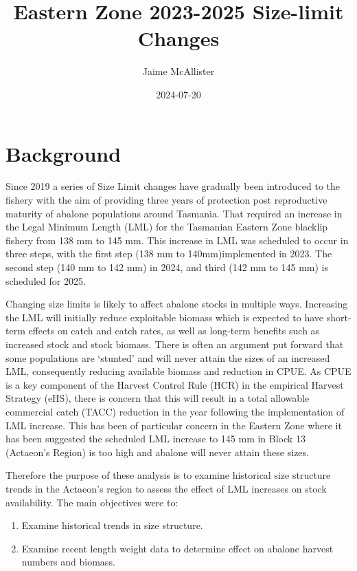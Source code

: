 \documentclass[
]{article}
\title{Eastern Zone 2023-2025 Size-limit Changes}
\author{Jaime McAllister}
\date{2024-07-20}
\providecommand{\tightlist}{%
  \setlength{\itemsep}{0pt}\setlength{\parskip}{0pt}}
\begin{document}
\maketitle

{
\setcounter{tocdepth}{2}
\tableofcontents
}
\section{Background}\label{background}

Since 2019 a series of Size Limit changes have gradually been introduced to the fishery with the aim of providing three years of protection post reproductive maturity of abalone populations around Tasmania. That required an increase in the Legal Minimum Length (LML) for the Tasmanian Eastern Zone blacklip fishery from 138 mm to 145 mm. This increase in LML was scheduled to occur in three steps, with the first step (138 mm to 140mm)implemented in 2023. The second step (140 mm to 142 mm) in 2024, and third (142 mm to 145 mm) is scheduled for 2025.

Changing size limits is likely to affect abalone stocks in multiple ways. Increasing the LML will initially reduce exploitable biomass which is expected to have short-term effects on catch and catch rates, as well as long-term benefits such as increased stock and stock biomass. There is often an argument put forward that some populations are `stunted' and will never attain the sizes of an increased LML, consequently reducing available biomass and reduction in CPUE. As CPUE is a key component of the Harvest Control Rule (HCR) in the empirical Harvest Strategy (eHS), there is concern that this will result in a total allowable commercial catch (TACC) reduction in the year following the implementation of LML increase. This has been of particular concern in the Eastern Zone where it has been suggested the scheduled LML increase to 145 mm in Block 13 (Actaeon's Region) is too high and abalone will never attain these sizes.

Therefore the purpose of these analysis is to examine historical size structure trends in the Actaeon's region to assess the effect of LML increases on stock availability. The main objectives were to:

\begin{enumerate}
\def\labelenumi{\arabic{enumi}.}
\tightlist
\item
  Examine historical trends in size structure.
\item
  Examine recent length weight data to determine effect on abalone harvest numbers and biomass.
\end{enumerate}
\end{document}
